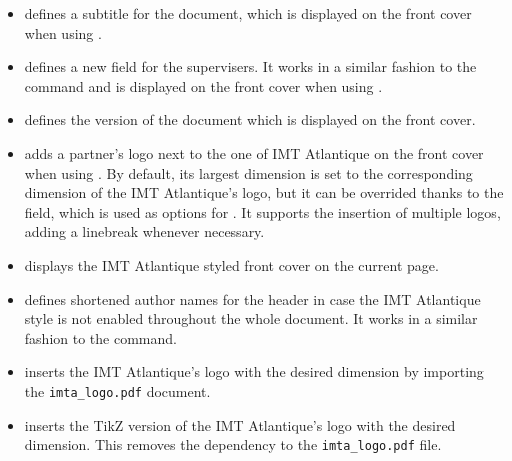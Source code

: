 \documentclass{report}
\begin{document}
\begin{itemize}
    \item {} defines a subtitle for the document, which is displayed on the front cover when using .
    
    \item {} defines a new field for the supervisers. 
    It works in a similar fashion to the  command and is displayed on the front cover when using .
    
    \item {} defines the version of the document which is displayed on the front cover.
    
    \item {} adds a partner's logo next to the one of IMT Atlantique on the front cover when using . 
    By default, its largest dimension is set to the corresponding dimension of the IMT Atlantique's logo, but it can be overrided thanks to the  field, which is used as options for . 
    It supports the insertion of multiple logos, adding a linebreak whenever necessary.
    
    \item {} displays the IMT Atlantique styled front cover on the current page.
    
    \item {} defines shortened author names for the header in case the IMT Atlantique style is not enabled throughout the whole document.
    It works in a similar fashion to the  command.
    
    \item {} inserts the IMT Atlantique's logo with the desired dimension by importing the \texttt{imta\_logo.pdf} document.
    
    \item {} inserts the TikZ version of the IMT Atlantique's logo with the desired dimension. 
    This removes the dependency to the \texttt{imta\_logo.pdf} file.
    

\end{itemize}
\end{document}
